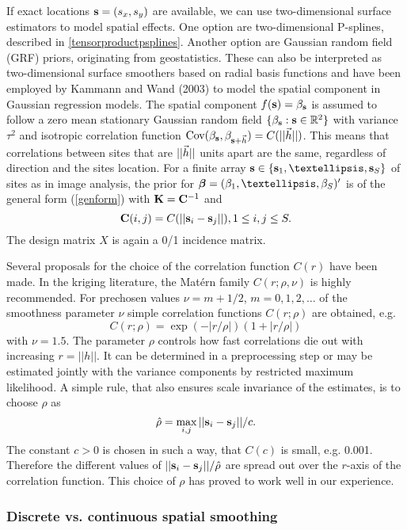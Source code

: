 \documentclass[11pt,a4paper,twoside]{bayesxarticle}
\begin{document}
If exact locations $\mathbf{s}=(s_x,s_y)$ are available, we can use
two-dimensional surface estimators to model spatial effects. One
option are two-dimensional P-splines, described in
\autoref{tensorproductpsplines}. Another option are Gaussian random
field (GRF) priors, originating from geostatistics. These can also
be interpreted as two-dimensional surface smoothers based on radial
basis functions and have been employed by Kammann and Wand (2003) to
model the spatial component in Gaussian regression models. The
spatial component $f(\mathbf{s})=\beta_{\mathbf{s}}$ is assumed to follow a zero
mean stationary Gaussian random field
$\{\beta_{\mathbf{s}}:\mathbf{s}\in\mathbb{R}^2\}$ with variance $\tau^2$ and
isotropic correlation function
$\mbox{Cov}(\beta_{\mathbf{s}},\beta_{\mathbf{s}+\vec{h}})=C(||\vec{h}||)$. This means
that correlations between sites that are $||\vec{h}||$ units apart are
the same, regardless of direction and the sites location. For a
finite array $\svec\in\{\svec_1,\ldots,\svec_S\}$ of sites as in
image analysis, the prior for $\betavec=(\beta_1,\ldots,\beta_S)'$
is of the general form (\ref{genform}) with $\mathbf{K}=\mathbf{C}^{-1}$ and
\[\mathbf{C}(i,j)=C(||\mathbf{s}_i-\mathbf{s}_j||), 1\le i,j\le S.\]
The design matrix $X$ is again a 0/1 incidence matrix.

Several proposals for the choice of the correlation function
$C(r)$ have been made. In the kriging literature, the Mat\'{e}rn
family $C(r;\rho,\nu)$ is highly recommended. For prechosen values $\nu=m+1/2$,
$m=0,1,2,\ldots$ of the smoothness parameter $\nu$ simple
correlation functions $C(r;\rho)$ are obtained, e.g.
\[C(r;\rho)=\exp(-|r/\rho|)(1+|r/\rho|)\]
with $\nu=1.5$. The parameter $\rho$ controls how fast correlations
die out with increasing $r=||h||$. It can be determined in a
preprocessing step or may be estimated jointly with the variance
components by restricted maximum likelihood. A simple rule, that
also ensures scale invariance of the estimates, is to choose $\rho$
as
\[\hat{\rho}=\max_{i,j}||\mathbf{s}_i-\mathbf{s}_j||/c.\]
The constant $c>0$ is chosen in such a way, that $C(c)$ is small,
e.g. 0.001. Therefore the different values of
$||\mathbf{s}_i-\mathbf{s}_j||/\hat{\rho}$ are spread out over the $r$-axis of
the correlation function. This choice of $\rho$ has proved to work
well in our experience.

\subsubsection{Discrete vs. continuous spatial smoothing}
\end{document}
